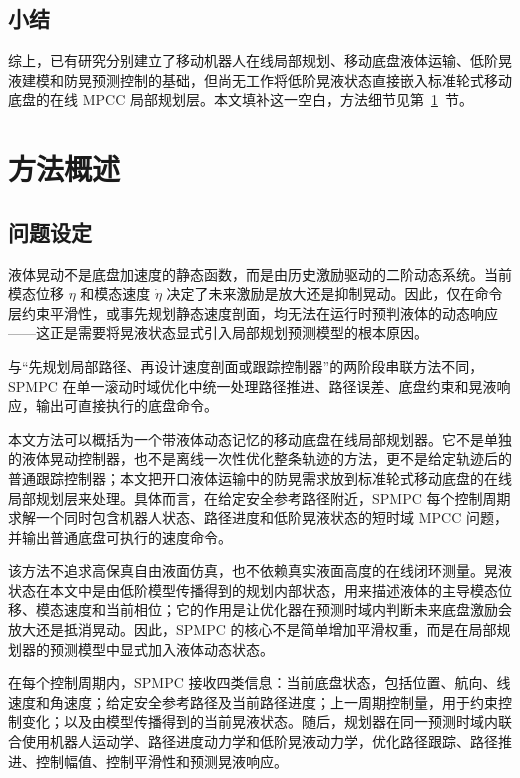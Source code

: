 \documentclass[12pt,a4paper]{ctexart}
\newcommand{\SPMPC}{SPMPC}
\newcommand{\MPCC}{MPCC}
\begin{document}
\subsection{小结}
\label{subsec:related-work-summary}

综上，已有研究分别建立了移动机器人在线局部规划、移动底盘液体运输、低阶晃液建模和防晃预测控制的基础，但尚无工作将低阶晃液状态直接嵌入标准轮式移动底盘的在线 \MPCC{} 局部规划层。本文填补这一空白，方法细节见第~\ref{sec:method}~节。

\section{方法概述}
\label{sec:method}

\subsection{问题设定}
\label{subsec:problem-setting}

液体晃动不是底盘加速度的静态函数，而是由历史激励驱动的二阶动态系统。当前模态位移 $\eta$ 和模态速度 $\dot{\eta}$ 决定了未来激励是放大还是抑制晃动。因此，仅在命令层约束平滑性，或事先规划静态速度剖面，均无法在运行时预判液体的动态响应——这正是需要将晃液状态显式引入局部规划预测模型的根本原因。

与“先规划局部路径、再设计速度剖面或跟踪控制器”的两阶段串联方法不同，\SPMPC{} 在单一滚动时域优化中统一处理路径推进、路径误差、底盘约束和晃液响应，输出可直接执行的底盘命令。

本文方法可以概括为一个带液体动态记忆的移动底盘在线局部规划器。它不是单独的液体晃动控制器，也不是离线一次性优化整条轨迹的方法，更不是给定轨迹后的普通跟踪控制器；本文把开口液体运输中的防晃需求放到标准轮式移动底盘的在线局部规划层来处理。具体而言，在给定安全参考路径附近，\SPMPC{} 每个控制周期求解一个同时包含机器人状态、路径进度和低阶晃液状态的短时域 \MPCC{} 问题，并输出普通底盘可执行的速度命令。

该方法不追求高保真自由液面仿真，也不依赖真实液面高度的在线闭环测量。晃液状态在本文中是由低阶模型传播得到的规划内部状态，用来描述液体的主导模态位移、模态速度和当前相位；它的作用是让优化器在预测时域内判断未来底盘激励会放大还是抵消晃动。因此，\SPMPC{} 的核心不是简单增加平滑权重，而是在局部规划器的预测模型中显式加入液体动态状态。

在每个控制周期内，\SPMPC{} 接收四类信息：当前底盘状态，包括位置、航向、线速度和角速度；给定安全参考路径及当前路径进度；上一周期控制量，用于约束控制变化；以及由模型传播得到的当前晃液状态。随后，规划器在同一预测时域内联合使用机器人运动学、路径进度动力学和低阶晃液动力学，优化路径跟踪、路径推进、控制幅值、控制平滑性和预测晃液响应。
\end{document}
